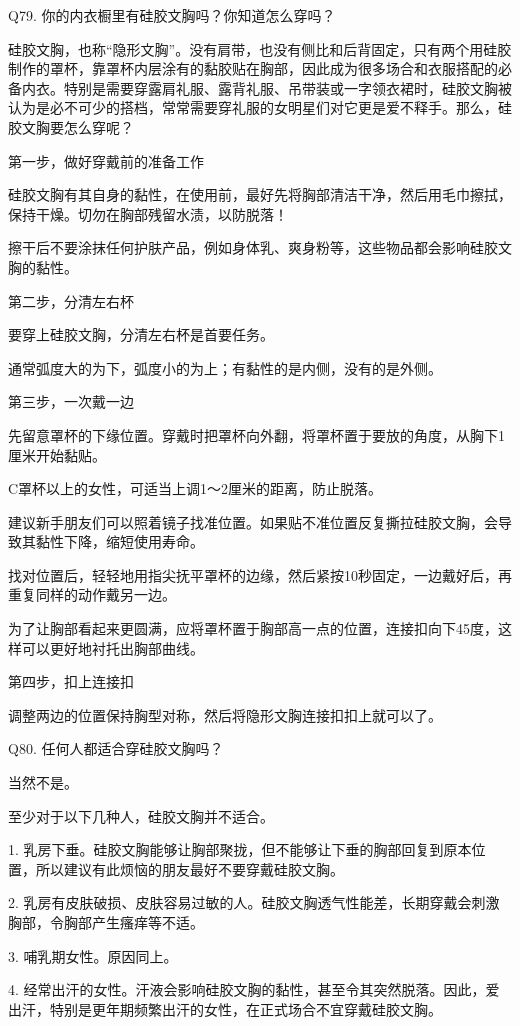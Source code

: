 \documentclass[12pt,UTF8]{ctexbook}
\begin{document}
Q79. 你的内衣橱里有硅胶文胸吗？你知道怎么穿吗？


硅胶文胸，也称“隐形文胸”。没有肩带，也没有侧比和后背固定，只有两个用硅胶制作的罩杯，靠罩杯内层涂有的黏胶贴在胸部，因此成为很多场合和衣服搭配的必备内衣。特别是需要穿露肩礼服、露背礼服、吊带装或一字领衣裙时，硅胶文胸被认为是必不可少的搭档，常常需要穿礼服的女明星们对它更是爱不释手。那么，硅胶文胸要怎么穿呢？

第一步，做好穿戴前的准备工作

硅胶文胸有其自身的黏性，在使用前，最好先将胸部清洁干净，然后用毛巾擦拭，保持干燥。切勿在胸部残留水渍，以防脱落！

擦干后不要涂抹任何护肤产品，例如身体乳、爽身粉等，这些物品都会影响硅胶文胸的黏性。

第二步，分清左右杯

要穿上硅胶文胸，分清左右杯是首要任务。

通常弧度大的为下，弧度小的为上；有黏性的是内侧，没有的是外侧。

第三步，一次戴一边

先留意罩杯的下缘位置。穿戴时把罩杯向外翻，将罩杯置于要放的角度，从胸下1厘米开始黏贴。

C罩杯以上的女性，可适当上调1～2厘米的距离，防止脱落。

建议新手朋友们可以照着镜子找准位置。如果贴不准位置反复撕拉硅胶文胸，会导致其黏性下降，缩短使用寿命。

找对位置后，轻轻地用指尖抚平罩杯的边缘，然后紧按10秒固定，一边戴好后，再重复同样的动作戴另一边。

为了让胸部看起来更圆满，应将罩杯置于胸部高一点的位置，连接扣向下45度，这样可以更好地衬托出胸部曲线。

第四步，扣上连接扣

调整两边的位置保持胸型对称，然后将隐形文胸连接扣扣上就可以了。





Q80. 任何人都适合穿硅胶文胸吗？


当然不是。

至少对于以下几种人，硅胶文胸并不适合。

1. 乳房下垂。硅胶文胸能够让胸部聚拢，但不能够让下垂的胸部回复到原本位置，所以建议有此烦恼的朋友最好不要穿戴硅胶文胸。

2. 乳房有皮肤破损、皮肤容易过敏的人。硅胶文胸透气性能差，长期穿戴会刺激胸部，令胸部产生瘙痒等不适。

3. 哺乳期女性。原因同上。

4. 经常出汗的女性。汗液会影响硅胶文胸的黏性，甚至令其突然脱落。因此，爱出汗，特别是更年期频繁出汗的女性，在正式场合不宜穿戴硅胶文胸。
\end{document}
